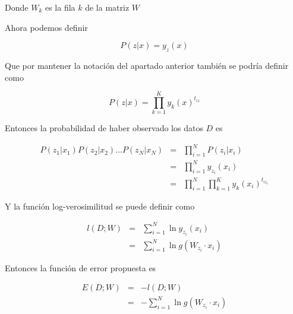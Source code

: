 \documentclass[a4paper]{article}
\begin{document}
\begin{enumerate}
{       Donde $W_k$ es la fila $k$ de la matriz $W$

       Ahora podemos definir

       \begin{equation*}
        P(z|x) = y_z(x)
       \end{equation*}

       Que por mantener la notación del apartado anterior también se podría definir como

       \begin{equation*}
        P(z|x) = \prod_{k = 1}^{K} y_k(x)^{t_{iz}}
       \end{equation*}

       Entonces la probabilidad de haber observado los datos $D$ es

       \begin{eqnarray*}
           P(z_1|x_1)P(z_2|x_2)\dots P(z_N|x_N)
           &=&
           \prod_{i = 1}^{N} P(z_i|x_i) \\
        &=&
        \prod_{i = 1}^{N} y_{z_i}(x_i) \\
        &=&
        \prod_{i = 1}^{N} \prod_{k = 1}^{K} y_k(x_i)^{t_{iz_i}}
       \end{eqnarray*}

       Y la función log-verosimilitud se puede definir como

       \begin{eqnarray*}
           l(D; W) &=&
           \sum_{i = 1}^{N}
           \ln y_{z_i}(x_i) \\
            &=&
            \sum_{i = 1}^{N}
            \ln g(W_{z_i}\cdot x_i)
       \end{eqnarray*}

       Entonces la función de error propuesta es

       \begin{eqnarray*}
           E(D;W) &=& -l(D;W) \\
        &=& -\sum_{i = 1}^{N}
        \ln g(W_{z_i}\cdot x_i)
       \end{eqnarray*}


}
\end{enumerate}
\end{document}
